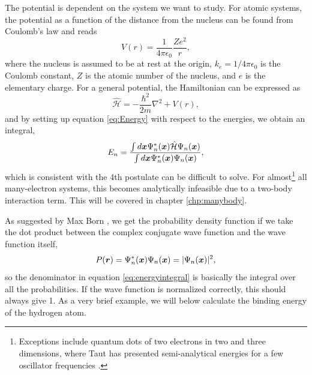 The potential is dependent on the system we want to study. For atomic systems, the potential as a function of the distance from the nucleus can be found from Coulomb's law and reads 
\begin{equation}
V(r)=\frac{1}{4\pi\epsilon_0}\frac{Ze^2}{r},
\label{eq:atompotential}
\end{equation}
where the nucleus is assumed to be at rest at the origin, $k_e=1/4\pi\epsilon_0$ is the Coulomb constant, $Z$ is the atomic number of the nucleus, and $e$ is the elementary charge. For a general potential, the Hamiltonian can be expressed as 
\begin{equation}
\hat{\mathcal{H}}=-\frac{\hbar^2}{2m}\nabla^2+V(r),
\label{eq:oneparticlehamiltonian}
\end{equation}
and by setting up equation \eqref{eq:Energy} with respect to the energies, we obtain an integral,
\begin{equation}
E_n=\frac{\int d\boldsymbol{{x}}\Psi_n^*(\boldsymbol{{x}})\hat{\mathcal{H}}\Psi_n(\boldsymbol{{x}})}{\int d\boldsymbol{{x}}\Psi_n^*(\boldsymbol{{x}})\Psi_n(\boldsymbol{{x}})},
\label{eq:energyintegral}
\end{equation}
which is consistent with the 4th postulate can be difficult to solve. For almost\footnote{Exceptions include quantum dots of two electrons in two and three dimensions, where Taut has presented semi-analytical energies for a few oscillator frequencies \supercite{taut_two_1993,taut_two_1994}.} all many-electron systems, this becomes analytically infeasible due to a two-body interaction term. This will be covered in chapter \ref{chp:manybody}.

As suggested by Max Born \supercite{born_zur_1926}, we get the probability density function if we take the dot product between the complex conjugate wave function and the wave function itself,
\begin{equation}
P(\boldsymbol{{r}})=\Psi_n^*(\boldsymbol{{x}})\Psi_n(\boldsymbol{{x}})=|\Psi_n(\boldsymbol{{x}})|^2,
\label{eq:pdf}
\end{equation}
so the denominator in equation \eqref{eq:energyintegral} is basically the integral over all the probabilities. If the wave function is normalized correctly, this should always give 1. As a very brief example, we will below calculate the binding energy of the hydrogen atom.

